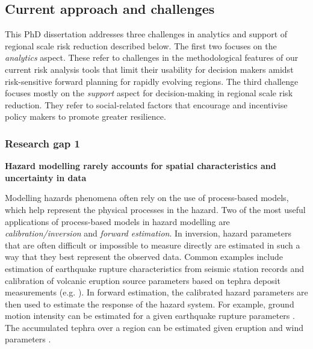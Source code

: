 
\subsection{Current approach and challenges} \label{subsec-int-gaps}

This PhD dissertation addresses three challenges in analytics and support of regional scale risk reduction described below. The first two focuses on the \textit{analytics} aspect. These refer to challenges in the methodological features of our current risk analysis tools that limit their usability for decision makers amidst risk-sensitive forward planning for rapidly evolving regions. The third challenge focuses mostly on the \textit{support} aspect for decision-making in regional scale risk reduction. They refer to social-related factors that encourage and incentivise policy makers to promote greater resilience.

\subsubsection{Research gap 1}

\textbf{Hazard modelling rarely accounts for spatial characteristics and uncertainty in data} 

Modelling hazards phenomena often rely on the use of process-based models, which help represent the physical processes in the hazard. Two of the most useful applications of process-based models in hazard modelling are \textit{calibration/inversion} and \textit{forward estimation}. In inversion, hazard parameters that are often difficult or impossible to measure directly are estimated in such a way that they best represent the observed data. Common examples include estimation of earthquake rupture characteristics from seismic station records and calibration of volcanic eruption source parameters based on tephra deposit measurements (e.g. \citet{li2022comparative, georgoudas2007cellular, connor2006inversion}). In forward estimation, the calibrated hazard parameters are then used to estimate the response of the hazard system. For example, ground motion intensity can be estimated for a given earthquake rupture parameters \citep{worden2010revised, wang2022ground}. The accumulated tephra over a region can be estimated given eruption and wind parameters \citep{hurst1999performance, folch2009fall3d}. 

